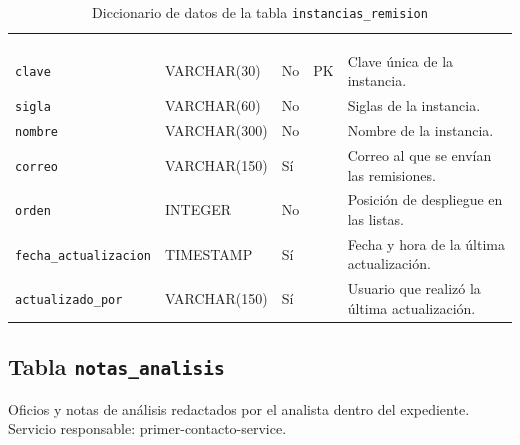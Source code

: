 \footnotesize
\renewcommand{\arraystretch}{1.15}
\setlength{\tabcolsep}{4pt}
\begin{longtable}{|L{3.9cm}|L{2.4cm}|L{0.9cm}|L{1.2cm}|L{6.6cm}|}
	\hiderowcolors\caption{Diccionario de datos de la tabla \texttt{instancias\_remision}}
	\label{tab:dic_instancias_remision} \\ \showrowcolors
	\hline
	 &  &  &  &  \\
	\hline
	\endfirsthead
	\hline
	 &  &  &  &  \\
	\hline
	\endhead
		\texttt{clave} & VARCHAR(30) & No & PK & Clave única de la instancia. \\ \hline
		\texttt{sigla} & VARCHAR(60) & No &  & Siglas de la instancia. \\ \hline
		\texttt{nombre} & VARCHAR(300) & No &  & Nombre de la instancia. \\ \hline
		\texttt{correo} & VARCHAR(150) & Sí &  & Correo al que se envían las remisiones. \\ \hline
		\texttt{orden} & INTEGER & No &  & Posición de despliegue en las listas. \\ \hline
		\texttt{fecha\_\allowbreak{}actualizacion} & TIMESTAMP & Sí &  & Fecha y hora de la última actualización. \\ \hline
		\texttt{actualizado\_\allowbreak{}por} & VARCHAR(150) & Sí &  & Usuario que realizó la última actualización. \\ \hline
\end{longtable}
\normalsize
\setlength{\tabcolsep}{6pt}
\renewcommand{\arraystretch}{1}

\subsection{Tabla \texttt{notas\_analisis}}
Oficios y notas de análisis redactados por el analista dentro del expediente. Servicio responsable: primer-contacto-service.


